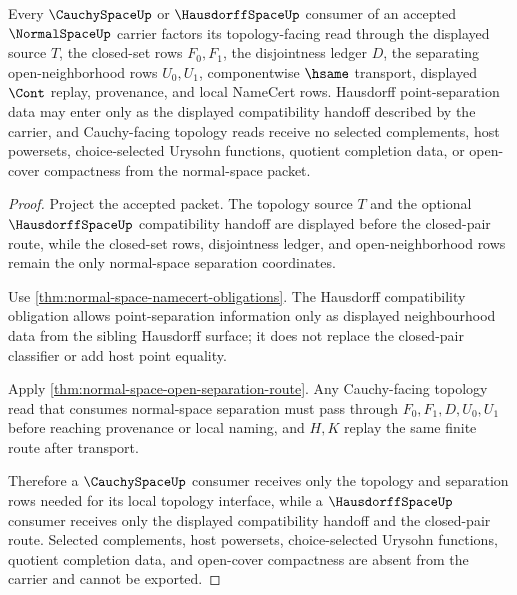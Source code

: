 \begin{theorem}
\label{thm:normalspace-cauchyspace-hausdorff-consumer-boundary}
Every $\CauchySpaceUp$ or $\HausdorffSpaceUp$ consumer of an accepted $\NormalSpaceUp$ carrier factors its topology-facing read through the displayed source $T$, the closed-set rows $F_0,F_1$, the disjointness ledger $D$, the separating open-neighborhood rows $U_0,U_1$, componentwise $\hsame$ transport, displayed $\Cont$ replay, provenance, and local NameCert rows. Hausdorff point-separation data may enter only as the displayed compatibility handoff described by the carrier, and Cauchy-facing topology reads receive no selected complements, host powersets, choice-selected Urysohn functions, quotient completion data, or open-cover compactness from the normal-space packet.
\end{theorem}
\begin{proof}
Project the accepted packet. The topology source $T$ and the optional $\HausdorffSpaceUp$ compatibility handoff are displayed before the closed-pair route, while the closed-set rows, disjointness ledger, and open-neighborhood rows remain the only normal-space separation coordinates.

Use \autoref{thm:normal-space-namecert-obligations}. The Hausdorff compatibility obligation allows point-separation information only as displayed neighbourhood data from the sibling Hausdorff surface; it does not replace the closed-pair classifier or add host point equality.

Apply \autoref{thm:normal-space-open-separation-route}. Any Cauchy-facing topology read that consumes normal-space separation must pass through $F_0,F_1,D,U_0,U_1$ before reaching provenance or local naming, and $H,K$ replay the same finite route after transport.

Therefore a $\CauchySpaceUp$ consumer receives only the topology and separation rows needed for its local topology interface, while a $\HausdorffSpaceUp$ consumer receives only the displayed compatibility handoff and the closed-pair route. Selected complements, host powersets, choice-selected Urysohn functions, quotient completion data, and open-cover compactness are absent from the carrier and cannot be exported.
\end{proof}

